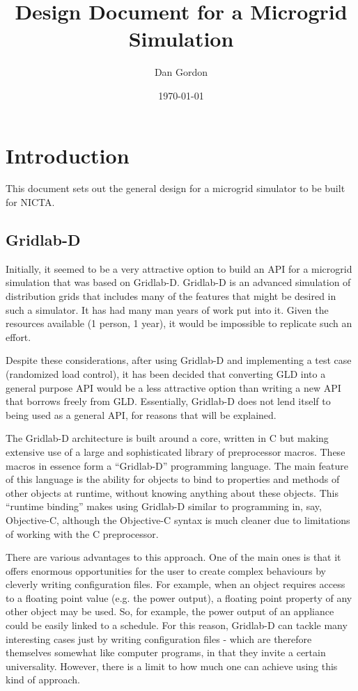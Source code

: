 \documentclass[12pt]{article}
\title{Design Document for a Microgrid Simulation}
\author{Dan Gordon}
\date{\today}
\begin{document}
\maketitle


\section{Introduction}
This document sets out the general design for a microgrid simulator to be built for NICTA.

\subsection{Gridlab-D}
Initially, it seemed to be a very attractive option to build an API for a microgrid simulation that was based on Gridlab-D. Gridlab-D is an advanced simulation of distribution grids that includes many of the features that might be desired in such a simulator. It has had many man years of work put into it. Given the resources available (1 person, 1 year), it would be impossible to replicate such an effort. 

Despite these considerations, after using Gridlab-D and implementing a test case (randomized load control), it has been decided that converting GLD into a general purpose API would be a less attractive option than writing a new API that borrows freely from GLD. Essentially, Gridlab-D does not lend itself to being used as a general API, for reasons that will be explained.

The Gridlab-D architecture is built around a core, written in C but making extensive use of a large and sophisticated library of preprocessor macros. These macros in essence form a ``Gridlab-D'' programming language. The main feature of this language is the ability for objects to bind to properties and methods of other objects at runtime, without knowing anything about these objects. This ``runtime binding'' makes using Gridlab-D similar to programming in, say, Objective-C, although the Objective-C syntax is much cleaner due to limitations of working with the C preprocessor.

There are various advantages to this approach. One of the main ones is that it offers enormous opportunities for the user to create complex behaviours by cleverly writing configuration files. For example, when an object requires access to a floating point value (e.g. the power output), a floating point property of any other object may be used. So, for example, the power output of an appliance could be easily linked to a schedule. For this reason, Gridlab-D can tackle many interesting cases just by writing configuration files - which are therefore themselves somewhat like computer programs, in that they invite a certain universality. However, there is a limit to how much one can achieve using this kind of approach.
\end{document}
